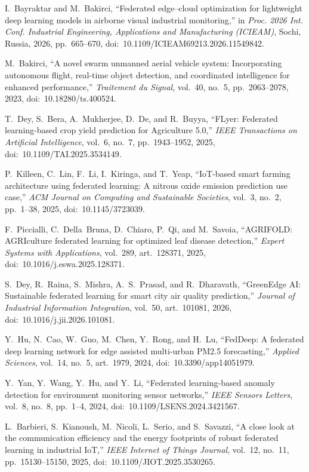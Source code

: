 
I.~Bayraktar and M.~Bakirci,
``Federated edge--cloud optimization for lightweight deep learning models in airborne visual industrial monitoring,''
in \emph{Proc. 2026 Int. Conf. Industrial Engineering, Applications and Manufacturing (ICIEAM)}, Sochi, Russia, 2026, pp.~665--670, doi:~10.1109/ICIEAM69213.2026.11549842.

M.~Bakirci,
``A novel swarm unmanned aerial vehicle system: Incorporating autonomous flight, real-time object detection, and coordinated intelligence for enhanced performance,''
\emph{Traitement du Signal}, vol.~40, no.~5, pp.~2063--2078, 2023, doi:~10.18280/ts.400524.

T.~Dey, S.~Bera, A.~Mukherjee, D.~De, and R.~Buyya,
``FLyer: Federated learning-based crop yield prediction for Agriculture 5.0,''
\emph{IEEE Transactions on Artificial Intelligence}, vol.~6, no.~7, pp.~1943--1952, 2025, doi:~10.1109/TAI.2025.3534149.

P.~Killeen, C.~Lin, F.~Li, I.~Kiringa, and T.~Yeap,
``IoT-based smart farming architecture using federated learning: A nitrous oxide emission prediction use case,''
\emph{ACM Journal on Computing and Sustainable Societies}, vol.~3, no.~2, pp.~1--38, 2025, doi:~10.1145/3723039.

F.~Piccialli, C.~Della~Bruna, D.~Chiaro, P.~Qi, and M.~Savoia,
``AGRIFOLD: AGRIculture federated learning for optimized leaf disease detection,''
\emph{Expert Systems with Applications}, vol.~289, art.~128371, 2025, doi:~10.1016/j.eswa.2025.128371.

S.~Dey, R.~Raina, S.~Mishra, A.~S.~Prasad, and R.~Dharavath,
``GreenEdge AI: Sustainable federated learning for smart city air quality prediction,''
\emph{Journal of Industrial Information Integration}, vol.~50, art.~101081, 2026, doi:~10.1016/j.jii.2026.101081.

Y.~Hu, N.~Cao, W.~Guo, M.~Chen, Y.~Rong, and H.~Lu,
``FedDeep: A federated deep learning network for edge assisted multi-urban PM2.5 forecasting,''
\emph{Applied Sciences}, vol.~14, no.~5, art.~1979, 2024, doi:~10.3390/app14051979.

Y.~Yan, Y.~Wang, Y.~Hu, and Y.~Li,
``Federated learning-based anomaly detection for environment monitoring sensor networks,''
\emph{IEEE Sensors Letters}, vol.~8, no.~8, pp.~1--4, 2024, doi:~10.1109/LSENS.2024.3421567.

L.~Barbieri, S.~Kianoush, M.~Nicoli, L.~Serio, and S.~Savazzi,
``A close look at the communication efficiency and the energy footprints of robust federated learning in industrial IoT,''
\emph{IEEE Internet of Things Journal}, vol.~12, no.~11, pp.~15130--15150, 2025, doi:~10.1109/JIOT.2025.3530265.


